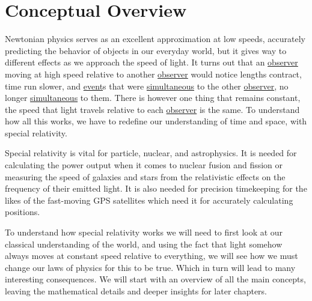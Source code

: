 \mainmatter
\chapter{Conceptual Overview}


Newtonian physics serves as an excellent approximation at low speeds, accurately predicting the behavior of objects in our everyday world, but it gives way to different effects as we approach the speed of light. It turns out that an \hyperlink{def-observer}{observer} moving at high speed relative to another \hyperlink{def-observer}{observer} would notice lengths contract, time run slower, and \hyperlink{def-event}{event}s that were \hyperlink{def-simultaneity}{simultaneous} to the other \hyperlink{def-observer}{observer}, no longer \hyperlink{def-simultaneity}{simultaneous} to them. There is however one thing that remains constant, the speed that light travels relative to each \hyperlink{def-observer}{observer} is the same. To understand how all this works, we have to redefine our understanding of time and space, with special relativity.

Special relativity is vital for particle, nuclear, and astrophysics. It is needed for calculating the power output when it comes to nuclear fusion and fission or measuring the speed of galaxies and stars from the relativistic effects on the frequency of their emitted light. It is also needed for precision timekeeping for the likes of the fast-moving GPS satellites which need it for accurately calculating positions.

To understand how special relativity works we will need to first look at our classical understanding of the world, and using the fact that light somehow always moves at constant speed relative to everything, we will see how we must change our laws of physics for this to be true. Which in turn will lead to many interesting consequences. We will start with an overview of all the main concepts, leaving the mathematical details and deeper insights for later chapters.



